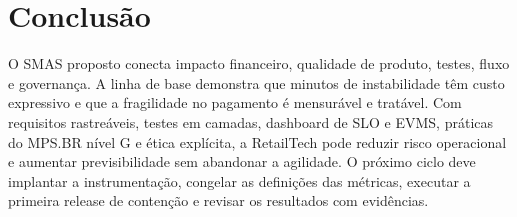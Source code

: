 \documentclass[12pt,openright,oneside,a4paper,brazil]{abntex2}
\begin{document}
\chapter{Conclusão}

O SMAS proposto conecta impacto financeiro, qualidade de produto, testes, fluxo e governança. A linha de base demonstra que minutos de instabilidade têm custo expressivo e que a fragilidade no pagamento é mensurável e tratável. Com requisitos rastreáveis, testes em camadas, dashboard de SLO e EVMS, práticas do MPS.BR nível G e ética explícita, a RetailTech pode reduzir risco operacional e aumentar previsibilidade sem abandonar a agilidade. O próximo ciclo deve implantar a instrumentação, congelar as definições das métricas, executar a primeira release de contenção e revisar os resultados com evidências.
\end{document}
